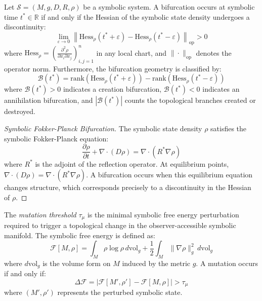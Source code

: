 \begin{theorem}
\label{theorem:bk6_symbolic_bifurcation_classification}
Let $\mathcal{S} = (M, g, D, R, \rho)$ be a symbolic system. A bifurcation occurs at symbolic time $t^* \in \mathbb{R}$ if and only if the Hessian of the symbolic state density undergoes a discontinuity:
\begin{equation}
\lim_{\varepsilon \to 0} \left\| \text{Hess}_\rho(t^* + \varepsilon) - \text{Hess}_\rho(t^* - \varepsilon) \right\|_{\text{op}} > 0
\end{equation}
where $\text{Hess}_\rho = \left(\frac{\partial^2 \rho}{\partial x_i \partial x_j}\right)_{i,j=1}^n$ in any local chart, and $\|\cdot\|_{\text{op}}$ denotes the operator norm.
Furthermore, the bifurcation geometry is classified by:
\begin{equation}
\mathcal{B}(t^*) = \text{rank}(\text{Hess}_\rho(t^* + \varepsilon)) - \text{rank}(\text{Hess}_\rho(t^* - \varepsilon))
\end{equation}
where $\mathcal{B}(t^*) > 0$ indicates a creation bifurcation, $\mathcal{B}(t^*) < 0$ indicates an annihilation bifurcation, and $|\mathcal{B}(t^*)|$ counts the topological branches created or destroyed.
\begin{proof}[Symbolic Fokker-Planck Bifurcation]
\label{proof:bk6_symbolic_fokker_planck_bifurcation}
The symbolic state density $\rho$ satisfies the symbolic Fokker-Planck equation:
\begin{equation}
\frac{\partial \rho}{\partial t} + \nabla \cdot (D \rho) = \nabla \cdot (R^* \nabla \rho)
\end{equation}
where $R^*$ is the adjoint of the reflection operator. At equilibrium points, $\nabla \cdot (D \rho) = \nabla \cdot (R^* \nabla \rho)$. A bifurcation occurs when this equilibrium equation changes structure, which corresponds precisely to a discontinuity in the Hessian of $\rho$.
\end{proof}
\end{theorem}
\begin{definition}
\label{definition:bk6_mutation_threshold}
The \emph{mutation threshold} $\tau_\mu$ is the minimal symbolic free energy perturbation required to trigger a topological change in the observer-accessible symbolic manifold. The symbolic free energy is defined as:
\begin{equation}
\mathcal{F}[M, \rho] = \int_M \rho \log \rho \, d\text{vol}_g + \frac{1}{2}\int_M \|\nabla \rho\|_g^2 \, d\text{vol}_g
\end{equation}
where $d\text{vol}_g$ is the volume form on $M$ induced by the metric $g$.
A mutation occurs if and only if:
\begin{equation}
\Delta \mathcal{F} = |\mathcal{F}[M', \rho'] - \mathcal{F}[M, \rho]| > \tau_\mu
\end{equation}
where $(M', \rho')$ represents the perturbed symbolic state.
\end{definition}
